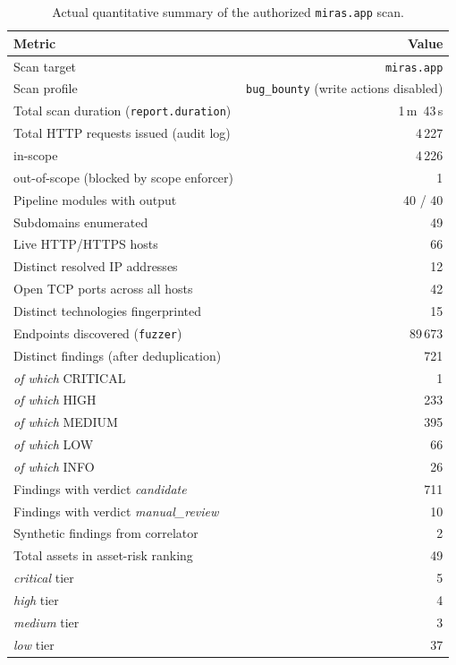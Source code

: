 \begin{table}[h]
\centering
\small
\begin{tabular}{|l|r|}
\hline
\textbf{Metric} & \textbf{Value} \\
\hline
Scan target                                       & \texttt{miras.app} \\
Scan profile                                      & \texttt{bug\_bounty} (write actions disabled) \\
Total scan duration (\texttt{report.duration})    & 1\,m~43\,s \\
Total HTTP requests issued (audit log)            & 4\,227 \\
\quad in-scope                                    & 4\,226 \\
\quad out-of-scope (blocked by scope enforcer)    & 1 \\
Pipeline modules with output                      & 40 / 40 \\
Subdomains enumerated                             & 49 \\
Live HTTP/HTTPS hosts                             & 66 \\
Distinct resolved IP addresses                    & 12 \\
Open TCP ports across all hosts                   & 42 \\
Distinct technologies fingerprinted               & 15 \\
Endpoints discovered (\texttt{fuzzer})            & 89\,673 \\
Distinct findings (after deduplication)           & 721 \\
\quad \textit{of which} CRITICAL                   & 1 \\
\quad \textit{of which} HIGH                       & 233 \\
\quad \textit{of which} MEDIUM                     & 395 \\
\quad \textit{of which} LOW                        & 66 \\
\quad \textit{of which} INFO                       & 26 \\
Findings with verdict \textit{candidate}          & 711 \\
Findings with verdict \textit{manual\_review}     & 10 \\
Synthetic findings from correlator                & 2 \\
Total assets in asset-risk ranking                & 49 \\
\quad \textit{critical} tier                       & 5 \\
\quad \textit{high} tier                           & 4 \\
\quad \textit{medium} tier                         & 3 \\
\quad \textit{low} tier                            & 37 \\
\hline
\end{tabular}
\caption{Actual quantitative summary of the authorized \texttt{miras.app} scan.}
\label{tab:miras-summary}
\end{table}

